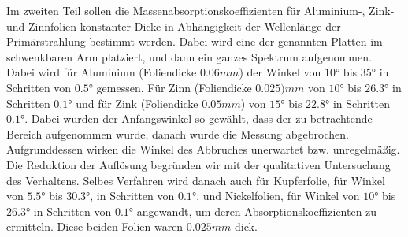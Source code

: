 Im zweiten Teil sollen die Massenabsorptionskoeffizienten für Aluminium-, Zink- und Zinnfolien konstanter Dicke in Abhängigkeit der Wellenlänge der Primärstrahlung bestimmt werden. Dabei wird eine der genannten Platten im schwenkbaren Arm platziert, und dann ein ganzes Spektrum aufgenommen. Dabei wird für Aluminium (Foliendicke $0.06 \unit{mm}$) der Winkel  von $\ang{10}$ bis $\ang{35}$ in Schritten von $\ang{0.5}$ gemessen. Für Zinn (Foliendicke $0.025) \unit{mm}$  von $\ang{10}$ bis $\ang{26.3}$ in Schritten $\ang{0.1}$ und für Zink (Foliendicke $0.05 \unit{mm}$) von $\ang{15}$ bis $\ang{22.8}$ in Schritten $\ang{0.1}$. Dabei wurden der Anfangswinkel so gewählt, dass der zu betrachtende Bereich aufgenommen wurde, danach wurde die Messung abgebrochen. Aufgrunddessen wirken die Winkel des Abbruches unerwartet bzw. unregelmäßig. Die Reduktion der Auflösung begründen wir mit der qualitativen Untersuchung des Verhaltens.  Selbes Verfahren wird danach auch für Kupferfolie, für Winkel von $\ang{5.5}$ bis $\ang{30.3}$, in Schritten von $\ang{0.1}$, und Nickelfolien, für  Winkel von $\ang{10}$ bis $\ang{26.3}$ in Schritten von $\ang{0.1}$ angewandt, um deren Absorptionskoeffizienten zu ermitteln. Diese beiden Folien waren $0.025 \unit{mm}$ dick. 